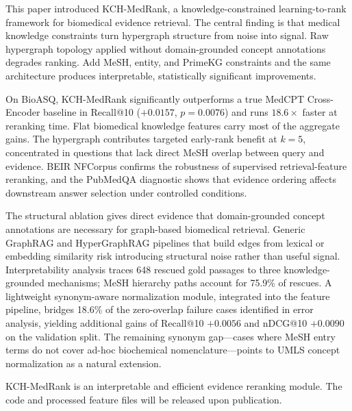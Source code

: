 This paper introduced KCH-MedRank, a knowledge-constrained learning-to-rank framework for biomedical evidence retrieval. The central finding is that medical knowledge constraints turn hypergraph structure from noise into signal. Raw hypergraph topology applied without domain-grounded concept annotations degrades ranking. Add MeSH, entity, and PrimeKG constraints and the same architecture produces interpretable, statistically significant improvements.

On BioASQ, KCH-MedRank significantly outperforms a true MedCPT Cross-Encoder baseline in Recall@10 ($+0.0157$, $p=0.0076$) and runs $18.6\times$ faster at reranking time. Flat biomedical knowledge features carry most of the aggregate gains. The hypergraph contributes targeted early-rank benefit at $k{=}5$, concentrated in questions that lack direct MeSH overlap between query and evidence. BEIR NFCorpus confirms the robustness of supervised retrieval-feature reranking, and the PubMedQA diagnostic shows that evidence ordering affects downstream answer selection under controlled conditions.

The structural ablation gives direct evidence that domain-grounded concept annotations are necessary for graph-based biomedical retrieval. Generic GraphRAG and HyperGraphRAG pipelines that build edges from lexical or embedding similarity risk introducing structural noise rather than useful signal. Interpretability analysis traces 648 rescued gold passages to three knowledge-grounded mechanisms; MeSH hierarchy paths account for 75.9\% of rescues. A lightweight synonym-aware normalization module, integrated into the feature pipeline, bridges 18.6\% of the zero-overlap failure cases identified in error analysis, yielding additional gains of Recall@10 $+0.0056$ and nDCG@10 $+0.0090$ on the validation split. The remaining synonym gap---cases where MeSH entry terms do not cover ad-hoc biochemical nomenclature---points to UMLS concept normalization as a natural extension.

KCH-MedRank is an interpretable and efficient evidence reranking module. The code and processed feature files will be released upon publication.
